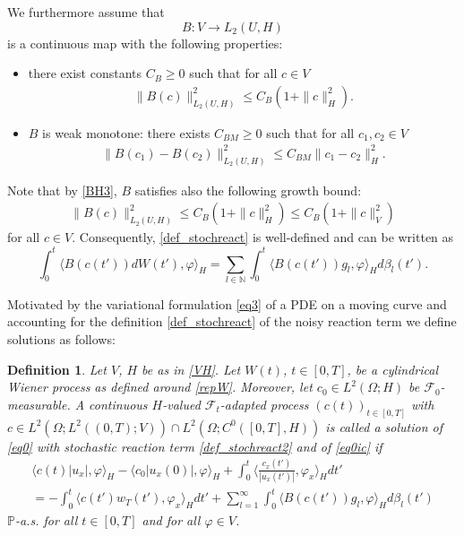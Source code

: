 \documentclass[a4paper,10pt]{article}
\newtheorem{defi}{Definition}[section]
\def\mbN{\mathbb{N}}
\numberwithin{equation}{section}
\begin{document}
We furthermore assume that
\begin{equation} \label{OPB}
B : V \to L_{2}(U,H)
\end{equation}
is a continuous map with the following properties:
\begin{itemize}
 \item
 there exist constants $ C_{B} \geq 0$
 such that for all $c \in V$ 
 \begin{align} \label{BH3}
 \| B(c) \|^{2}_{L_{2}(U,H)} \leq C_{B}(1 + \| c \|^{2}_{H}).
 \end{align}
 \item
 $B$ is weak monotone: there exists $C_{BM}\geq 0$ such that for all $c_{1}, c_{2} \in V$
 \begin{align}\label{BH2}
 \| B(c_{1}) - B(c_{2}) \|^{2}_{L_{2}(U,H)} \leq C_{BM}\| c_{1} - c_{2} \|^{2}_{H}.
 \end{align}
\end{itemize}
Note that by \eqref{BH3}, $B$ satisfies also the following growth bound:
\begin{align}\label{BH4}
 \| B( c) \|^{2}_{L_{2}(U,H)} \leq C_{B} (1 + \| c \|^{2}_{H}) \leq C_{B} (1 + \| c \|^{2}_{V})
\end{align}
for all $c \in V$.
Consequently, \eqref{def_stochreact} is well-defined and can be written as
\begin{equation} \label{def_stochreact2}
 \int_0^t \langle B(c(t')) dW(t'), \varphi \rangle_{H} = \sum_{l \in \mbN} \int_0^t \langle B(c(t')) g_l, \varphi \rangle_{H} d \beta_l(t').
\end{equation}



Motivated by the variational formulation \eqref{eq3} of a PDE on a moving curve and accounting for the definition \eqref{def_stochreact} of the noisy reaction term we define solutions as follows:

\begin{defi} \label{def_solution}
Let
$V$, $H$ be as in \eqref{VH}. Let $W(t)$, $t \in [0,T]$, be a cylindrical Wiener process as defined around \eqref{repW}.
Moreover, let $c_{0} \in L^{2}(\Omega; H)$ be $\mathcal{F}_{0}$-measurable. A continuous $H$-valued $\mathcal{F}_t$-adapted process $(c(t))_{t\in [0,T]}$ with $c \in L^{2}(\Omega;L^{2}((0,T);V)) \cap L^{2}(\Omega;C^{0}([0,T],H))$ is called a solution of \eqref{eq0} with stochastic reaction term \eqref{def_stochreact2} and of \eqref{eq0ic} if
\begin{multline} \label{eq:def_solution}
\langle c(t) |u_x|, \varphi \rangle_{H} - \langle c_{0} |u_x(0)|, \varphi \rangle_{H} + \int_{0}^{t} \langle \frac{c_{x}(t')}{|u_{x}(t')|}, \varphi_{x} \rangle_{H} dt'
\\
= - \int_{0}^{t} \langle c(t') w_{T}(t'), \varphi_{x} \rangle_{H} dt' + \sum_{l=1}^{\infty} \int_{0}^{t} \langle B (c(t')) g_{l} , \varphi \rangle_{H} d \beta_{l}(t')
\end{multline}
$\mathbb{P}$-a.s. for all $ t \in [0,T]$ and for all $\varphi \in V$.
\end{defi}
\end{document}
